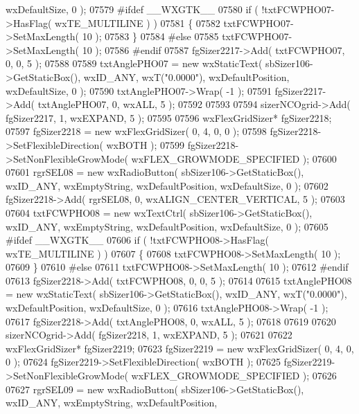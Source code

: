 \begin{DoxyCode}
      wxDefaultSize, 0 );
07579 \textcolor{preprocessor}{    #ifdef \_\_WXGTK\_\_}
07580     \textcolor{keywordflow}{if} ( !txtFCWPHO07->HasFlag( wxTE\_MULTILINE ) )
07581     \{
07582     txtFCWPHO07->SetMaxLength( 10 );
07583     \}
07584 \textcolor{preprocessor}{    #else}
07585     txtFCWPHO07->SetMaxLength( 10 );
07586 \textcolor{preprocessor}{    #endif}
07587     fgSizer2217->Add( txtFCWPHO07, 0, 0, 5 );
07588     
07589     txtAnglePHO07 = \textcolor{keyword}{new} wxStaticText( sbSizer106->GetStaticBox(), wxID\_ANY, wxT(\textcolor{stringliteral}{"0.0000"}), 
      wxDefaultPosition, wxDefaultSize, 0 );
07590     txtAnglePHO07->Wrap( -1 );
07591     fgSizer2217->Add( txtAnglePHO07, 0, wxALL, 5 );
07592     
07593     
07594     sizerNCOgrid->Add( fgSizer2217, 1, wxEXPAND, 5 );
07595     
07596     wxFlexGridSizer* fgSizer2218;
07597     fgSizer2218 = \textcolor{keyword}{new} wxFlexGridSizer( 0, 4, 0, 0 );
07598     fgSizer2218->SetFlexibleDirection( wxBOTH );
07599     fgSizer2218->SetNonFlexibleGrowMode( wxFLEX\_GROWMODE\_SPECIFIED );
07600     
07601     rgrSEL08 = \textcolor{keyword}{new} wxRadioButton( sbSizer106->GetStaticBox(), wxID\_ANY, wxEmptyString, wxDefaultPosition, 
      wxDefaultSize, 0 );
07602     fgSizer2218->Add( rgrSEL08, 0, wxALIGN\_CENTER\_VERTICAL, 5 );
07603     
07604     txtFCWPHO08 = \textcolor{keyword}{new} wxTextCtrl( sbSizer106->GetStaticBox(), wxID\_ANY, wxEmptyString, wxDefaultPosition, 
      wxDefaultSize, 0 );
07605 \textcolor{preprocessor}{    #ifdef \_\_WXGTK\_\_}
07606     \textcolor{keywordflow}{if} ( !txtFCWPHO08->HasFlag( wxTE\_MULTILINE ) )
07607     \{
07608     txtFCWPHO08->SetMaxLength( 10 );
07609     \}
07610 \textcolor{preprocessor}{    #else}
07611     txtFCWPHO08->SetMaxLength( 10 );
07612 \textcolor{preprocessor}{    #endif}
07613     fgSizer2218->Add( txtFCWPHO08, 0, 0, 5 );
07614     
07615     txtAnglePHO08 = \textcolor{keyword}{new} wxStaticText( sbSizer106->GetStaticBox(), wxID\_ANY, wxT(\textcolor{stringliteral}{"0.0000"}), 
      wxDefaultPosition, wxDefaultSize, 0 );
07616     txtAnglePHO08->Wrap( -1 );
07617     fgSizer2218->Add( txtAnglePHO08, 0, wxALL, 5 );
07618     
07619     
07620     sizerNCOgrid->Add( fgSizer2218, 1, wxEXPAND, 5 );
07621     
07622     wxFlexGridSizer* fgSizer2219;
07623     fgSizer2219 = \textcolor{keyword}{new} wxFlexGridSizer( 0, 4, 0, 0 );
07624     fgSizer2219->SetFlexibleDirection( wxBOTH );
07625     fgSizer2219->SetNonFlexibleGrowMode( wxFLEX\_GROWMODE\_SPECIFIED );
07626     
07627     rgrSEL09 = \textcolor{keyword}{new} wxRadioButton( sbSizer106->GetStaticBox(), wxID\_ANY, wxEmptyString, wxDefaultPosition, 

\end{DoxyCode}
